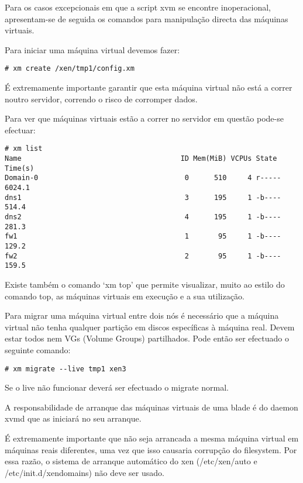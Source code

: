 Para os casos excepcionais em que a script xvm se encontre inoperacional, apresentam-se de seguida os comandos para manipulação directa das máquinas virtuais.

Para iniciar uma máquina virtual devemos fazer:

\begin{Verbatim}[commandchars=\\\{\}]
# xm create /xen/tmp1/config.xm
\end{Verbatim}

É extremamente importante garantir que esta máquina virtual não está a correr noutro servidor, correndo o risco de corromper dados.

Para ver que máquinas virtuais estão a correr no servidor em questão pode-se efectuar:

\begin{Verbatim}[commandchars=\\\{\}]
# xm list
Name                                      ID Mem(MiB) VCPUs State   Time(s)
Domain-0                                   0      510     4 r-----   6024.1
dns1                                       3      195     1 -b----    514.4
dns2                                       4      195     1 -b----    281.3
fw1                                        1       95     1 -b----    129.2
fw2                                        2       95     1 -b----    159.5
\end{Verbatim}

Existe também o comando `xm top' que permite visualizar, muito ao estilo do comando top, as máquinas virtuais em execução e a sua utilização.

Para migrar uma máquina virtual entre dois nós é necessário que a máquina virtual não tenha qualquer partição em discos específicas à máquina real. Devem estar todos nem VGs (Volume Groups) partilhados. Pode então ser efectuado o seguinte comando:

\begin{Verbatim}[commandchars=\\\{\}]
# xm migrate --live tmp1 xen3
\end{Verbatim}

Se o live não funcionar deverá ser efectuado o migrate normal.

A responsabilidade de arranque das máquinas virtuais de uma blade é do daemon xvmd que as iniciará no seu arranque.

É extremamente importante que não seja arrancada a mesma máquina virtual em
máquinas reais diferentes, uma vez que isso causaria corrupção do filesystem.
Por essa razão, o sistema de arranque automático do xen (/etc/xen/auto e
/etc/init.d/xendomains) não deve ser usado.

